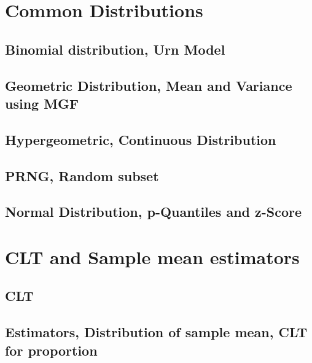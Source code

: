 \documentclass[4pt]{beamer} %
\begin{document}
\section{Common Distributions}
\subsection{Binomial distribution, Urn Model}
{

}

\subsection{Geometric Distribution, Mean and Variance using MGF}
{


}

\subsection{Hypergeometric, Continuous Distribution}
{

}

\subsection{PRNG, Random subset}
{

}

\subsection{Normal Distribution, p-Quantiles and z-Score}
{



}


\section{CLT and Sample mean estimators}
\subsection{CLT}
{


}




\subsection{Estimators, Distribution of sample mean, CLT for proportion}
{

}
\end{document}
